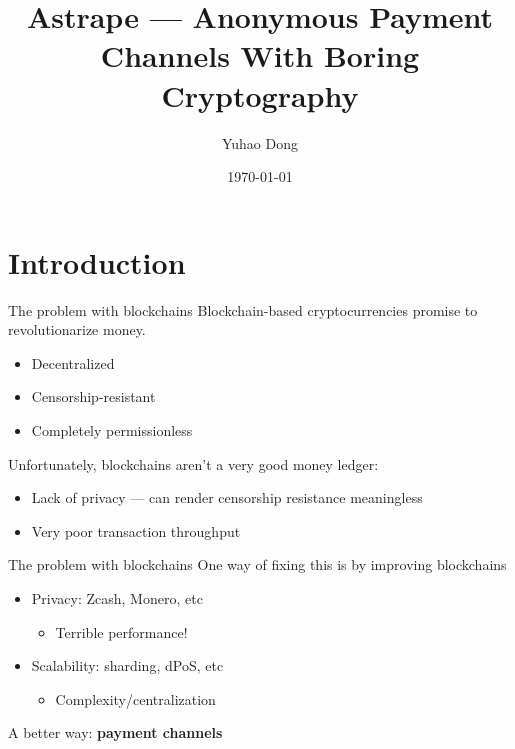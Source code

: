 \documentclass[aspectratio=169]{beamer}
\title{Astrape --- Anonymous Payment Channels With Boring Cryptography}
\author{Yuhao Dong}
\institute{University of Waterloo}
\date{\today}
\begin{document}
\frame{\titlepage}

\section{Introduction}

\begin{frame}{The problem with blockchains}
    Blockchain-based cryptocurrencies promise to revolutionarize money.
    \begin{itemize}
        \item Decentralized
        \item Censorship-resistant
        \item Completely permissionless
    \end{itemize}

    Unfortunately, blockchains aren't a very good money ledger:
    \begin{itemize}
        \item Lack of privacy --- can render censorship resistance meaningless
        \item Very poor transaction throughput
    \end{itemize}
\end{frame}

\begin{frame}{The problem with blockchains}
    One way of fixing this is by improving blockchains
    \begin{itemize}
        \item Privacy: Zcash, Monero, etc
              \begin{itemize}
                  \item Terrible performance!
              \end{itemize}
        \item Scalability: sharding, dPoS, etc
              \begin{itemize}
                  \item Complexity/centralization
              \end{itemize}
    \end{itemize}

    A better way: \textbf{payment channels}
\end{frame}
\end{document}
